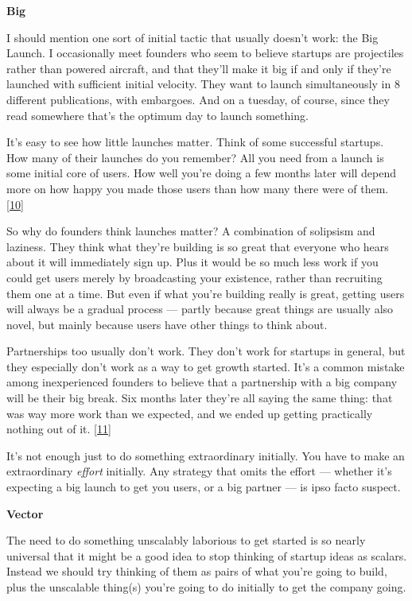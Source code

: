 \textbf{Big}

I should mention one sort of initial tactic that usually doesn't work:
the Big Launch. I occasionally meet founders who seem to believe
startups are projectiles rather than powered aircraft, and that they'll
make it big if and only if they're launched with sufficient initial
velocity. They want to launch simultaneously in 8 different
publications, with embargoes. And on a tuesday, of course, since they
read somewhere that's the optimum day to launch something.

It's easy to see how little launches matter. Think of some successful
startups. How many of their launches do you remember? All you need from
a launch is some initial core of users. How well you're doing a few
months later will depend more on how happy you made those users than how
many there were of them. {[}\hyperref[f10n]{10}{]}

So why do founders think launches matter? A combination of solipsism and
laziness. They think what they're building is so great that everyone who
hears about it will immediately sign up. Plus it would be so much less
work if you could get users merely by broadcasting your existence,
rather than recruiting them one at a time. But even if what you're
building really is great, getting users will always be a gradual process
--- partly because great things are usually also novel, but mainly
because users have other things to think about.

Partnerships too usually don't work. They don't work for startups in
general, but they especially don't work as a way to get growth started.
It's a common mistake among inexperienced founders to believe that a
partnership with a big company will be their big break. Six months later
they're all saying the same thing: that was way more work than we
expected, and we ended up getting practically nothing out of it.
{[}\hyperref[f11n]{11}{]}

It's not enough just to do something extraordinary initially. You have
to make an extraordinary \emph{effort} initially. Any strategy that
omits the effort --- whether it's expecting a big launch to get you
users, or a big partner --- is ipso facto suspect.

\textbf{Vector}

The need to do something unscalably laborious to get started is so
nearly universal that it might be a good idea to stop thinking of
startup ideas as scalars. Instead we should try thinking of them as
pairs of what you're going to build, plus the unscalable thing(s) you're
going to do initially to get the company going.

